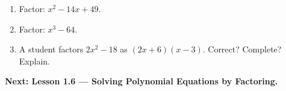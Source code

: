 \documentclass[aspectratio=169, 11pt]{beamer}
\begin{document}
\begin{frame}[t, plain]
  \begin{enumerate}
    \setlength{\itemsep}{0.35cm}
    \item Factor: $x^2-14x+49$.
    \item Factor: $x^3-64$.
    \item A student factors $2x^2-18$ as $(2x+6)(x-3)$. Correct? Complete? Explain.
  \end{enumerate}
  \vspace{0.3cm}
  {\color{royal}\bfseries Next: Lesson 1.6 --- Solving Polynomial Equations by Factoring.}
\end{frame}
\end{document}
